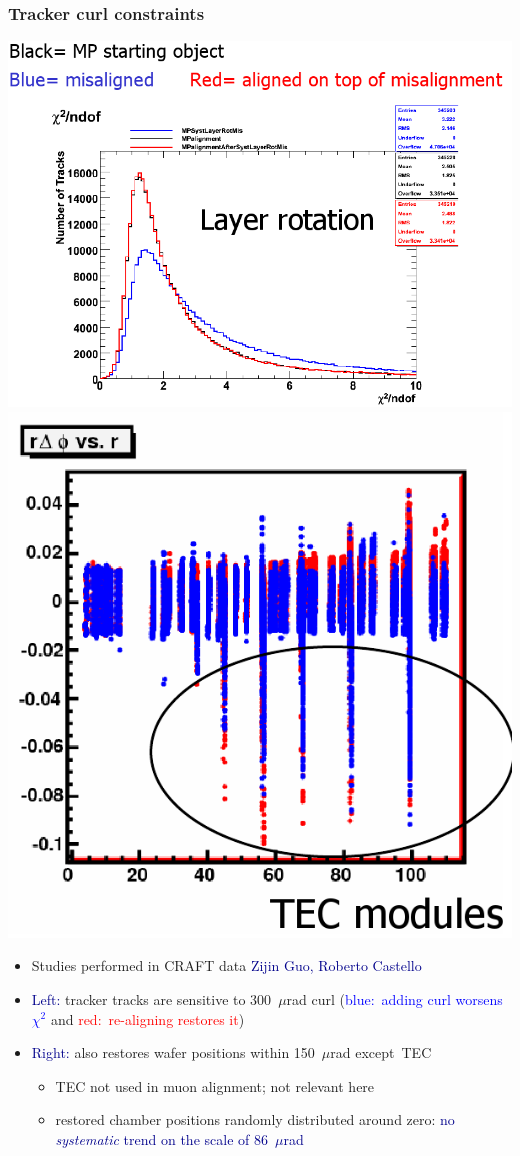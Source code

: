 \documentclass[compress]{beamer}
\begin{document}
\begin{frame}
\frametitle{Tracker curl constraints}

\includegraphics[width=0.55\linewidth]{tracks_are_sensitive_to_curl.png} \hfill \includegraphics[width=0.35\linewidth]{curl_is_not_86microns.png}

\begin{itemize}
\item Studies performed in CRAFT data \hfill \textcolor{darkblue}{\scriptsize Zijin Guo, Roberto Castello}
\item \textcolor{darkblue}{Left:} tracker tracks are sensitive to 300~$\mu$rad curl (\textcolor{blue}{blue:\ adding curl worsens $\chi^2$} and \textcolor{red}{red:\ re-aligning restores it})
\item \textcolor{darkblue}{Right:} also restores wafer positions within 150~$\mu$rad \mbox{except TEC\hspace{-1 cm}}
\begin{itemize}
\item TEC not used in muon alignment; not relevant here
\item restored chamber positions randomly distributed around zero: \textcolor{darkblue}{no {\it systematic} trend on the scale of 86~$\mu$rad}
\end{itemize}
\end{itemize}
\end{frame}
\end{document}
